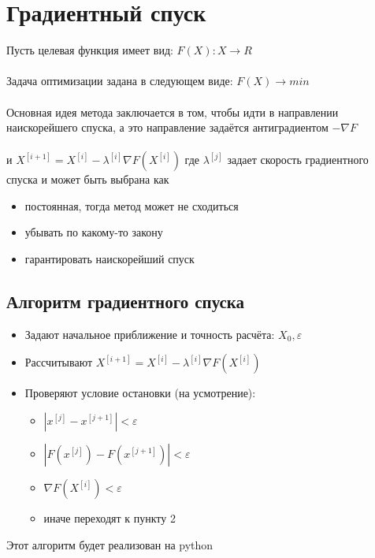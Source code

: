 \documentclass{article}
\begin{document}
    \newpage
    \section{Градиентный спуск}
    Пусть целевая функция имеет вид:
    $F(X): X \rightarrow R$\\\\
    Задача оптимизации задана в следующем виде:
    $F(X) \xrightarrow{} min$\\\\
    Основная идея метода заключается в том, чтобы идти в направлении наискорейшего спуска, а это направление задаётся антиградиентом $-\nabla F$\\\\
    и $X^{[i+1]}=X^{[i]}-\lambda^{[i]}\nabla F(X^{[i]})$
    где $\lambda ^{[j]}$ задает скорость градиентного спуска и может быть выбрана как
    \begin{itemize}
        \item постоянная, тогда метод может не сходиться
        \item убывать по какому-то закону
        \item гарантировать наискорейший спуск
    \end{itemize}

    \subsection{Алгоритм градиентного спуска}
    \begin{itemize}
        \item Задают начальное приближение и точность расчёта: $X_0, \varepsilon$
        \item Рассчитывают $X^{[i+1]}=X^{[i]}-\lambda^{[i]}\nabla F(X^{[i]})$
        \item Проверяют условие остановки (на усмотрение):
        \begin{itemize}
            \item $|x^{[j]}-x^{[j+1]}|<\varepsilon$
            \item $|F(x^{[j]})-F(x^{[j+1]})|
            <\varepsilon$
            \item $\nabla F(X^{[i]})<\varepsilon$
            \item иначе переходят к пункту 2
        \end{itemize}
    \end{itemize}

    Этот алгоритм будет реализован на python
\end{document}
